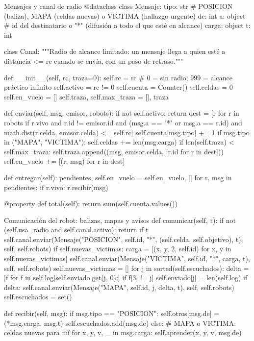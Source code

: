 \documentclass[11pt,letterpaper]{article}
\begin{document}
\begin{codigo}[label=cod:canal]{Mensajes y canal de radio}
@dataclass
class Mensaje:
    tipo: str        # POSICION (baliza), MAPA (celdas nuevas) o VICTIMA (hallazgo urgente)
    de: int
    a: object        # id del destinatario o "*" (difusión a todo el que esté en alcance)
    carga: object
    t: int


class Canal:
    """Radio de alcance limitado: un mensaje llega a quien esté a distancia <= rc cuando se envía, con un paso de retraso."""

    def __init__(self, rc, traza=0):
        self.rc = rc                      # 0 = sin radio; 999 = alcance práctico infinito
        self.activo = rc != 0
        self.cuenta = Counter()
        self.celdas = 0
        self.en_vuelo = []
        self.traza, self.max_traza = [], traza

    def enviar(self, msg, emisor, robots):
        if not self.activo:
            return
        dest = [r for r in robots if r.vivo and r.id != emisor.id and (msg.a == "*" or msg.a == r.id)
                and math.dist(r.celda, emisor.celda) <= self.rc]
        self.cuenta[msg.tipo] += 1
        if msg.tipo in ("MAPA", "VICTIMA"):
            self.celdas += len(msg.carga)
        if len(self.traza) < self.max_traza:
            self.traza.append((msg, emisor.celda, [r.id for r in dest]))
        self.en_vuelo += [(r, msg) for r in dest]

    def entregar(self):
        pendientes, self.en_vuelo = self.en_vuelo, []
        for r, msg in pendientes:
            if r.vivo:
                r.recibir(msg)

    @property
    def total(self):
        return sum(self.cuenta.values())
\end{codigo}

\begin{codigo}[label=cod:robot]{Comunicación del robot: balizas, mapas y avisos}
    def comunicar(self, t):
        if not (self.usa_radio and self.canal.activo):
            return
        if t %
            self.canal.enviar(Mensaje("POSICION", self.id, "*", (self.celda, self.objetivo), t), self, self.robots)
        if self.nuevas_victimas:
            carga = [(x, y, 2, self.id) for x, y in self.nuevas_victimas]
            self.canal.enviar(Mensaje("VICTIMA", self.id, "*", carga, t), self, self.robots)
        self.nuevas_victimas = []
        for j in sorted(self.escuchados):
            delta = [f for f in self.log[self.enviado.get(j, 0):] if f[3] != j]
            self.enviado[j] = len(self.log)
            if delta:
                self.canal.enviar(Mensaje("MAPA", self.id, j, delta, t), self, self.robots)
        self.escuchados = set()

    def recibir(self, msg):
        if msg.tipo == "POSICION":
            self.otros[msg.de] = (*msg.carga, msg.t)
            self.escuchados.add(msg.de)
        else:                                   # MAPA o VICTIMA: celdas nuevas para mí
            for x, y, v, _ in msg.carga:
                self.aprender(x, y, v, msg.de)
\end{codigo}
\end{document}
